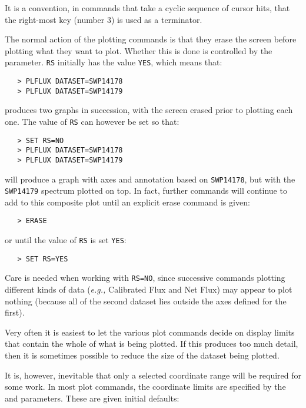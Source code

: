 It is a convention, in commands that take a cyclic sequence of cursor hits,
that the right-most key (number 3) is used as a terminator.

The normal action of the plotting commands is that they erase the screen
before plotting what they want to plot.  Whether this is done is controlled by
the 
 parameter.  \verb+RS+ initially has the value \verb+YES+, which
means that:

\begin{verbatim}
   > PLFLUX DATASET=SWP14178
   > PLFLUX DATASET=SWP14179
\end{verbatim}

produces two graphs in succession, with the screen erased prior to plotting
each one.  The value of \verb+RS+ can however be set so that:

\begin{verbatim}
   > SET RS=NO
   > PLFLUX DATASET=SWP14178
   > PLFLUX DATASET=SWP14179
\end{verbatim}

will produce a graph with axes and annotation based on \verb+SWP14178+, but with
the \verb+SWP14179+ spectrum plotted on top.  In fact, further commands will
continue to add to this composite plot until an explicit erase command is given:

\begin{verbatim}
   > ERASE
\end{verbatim}

or until the value of \verb+RS+ is set \verb+YES+:

\begin{verbatim}
   > SET RS=YES
\end{verbatim}

Care is needed when working with \verb+RS=NO+, since successive commands
plotting different kinds of data ({\it{e.g.,}} Calibrated Flux and Net Flux)
may appear
to plot nothing (because all of the second dataset lies outside the axes
defined for the first)\@.

Very often it is easiest to let the various plot commands decide on display
limits that contain the whole of what is being plotted.  If this produces too
much detail, then it is sometimes possible to reduce the size of the dataset
being plotted.

It is, however, inevitable that only a selected coordinate range will be
required for some work.  In most plot commands, the coordinate limits are
specified by the 
 and 
 parameters.  These are given initial
defaults:

